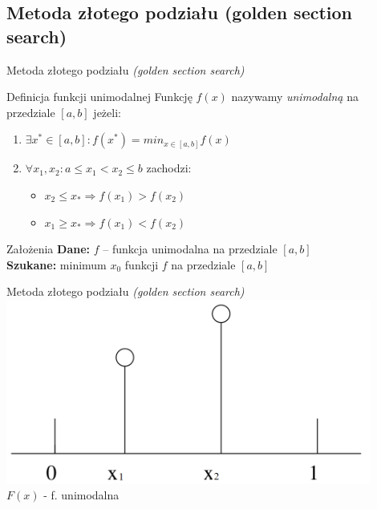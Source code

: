\subsection{Metoda złotego podziału (golden section search)}
    \begin{frame}{Metoda złotego podziału \emph{(golden section search)}}
    \begin{block}{Definicja funkcji unimodalnej}
      Funkcję $f(x)$ nazywamy \emph{unimodalną} na przedziale
      $[a{,}b]$ jeżeli:
      \begin{enumerate}
        \item $\exists x^{*}\in [a{,}b] : f(x^{*}) = min_{x \in [a{,}b]}f(x)$
        \item $\forall x_{1}{,}x_{2} : a \leq x_{1} < x_{2} \leq b$ zachodzi:
        \begin{itemize}
          \item $x_{2} \leq x_{*} \Rightarrow f(x_{1}) > f(x_{2})$
          \item $x_{1} \geq x_{*} \Rightarrow f(x_{1}) < f(x_{2})$
        \end{itemize}
      \end{enumerate}
    \end{block}
    \begin{block}{Założenia}
      \textbf{Dane:} $f$ -- funkcja unimodalna na przedziale $[a, b]$\\
      \textbf{Szukane:} minimum $x_0$ funkcji $f$ na przedziale $[a, b]$
    \end{block}
  \end{frame}

  \begin{frame}{Metoda złotego podziału \emph{(golden section search)}}
    \includegraphics[width=0.9\textwidth]{img/17/f_unimodalna}
    \\
    $F(x)$ - f. unimodalna
  \end{frame}

